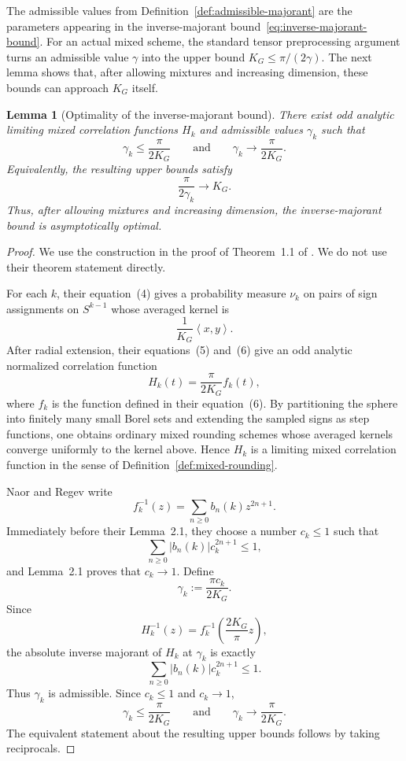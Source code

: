 \documentclass[11pt]{article}
\newtheorem{lemma}[theorem]{Lemma}
\numberwithin{equation}{section}
\newcommand{\ip}[2]{\left\langle #1,#2\right\rangle}
\begin{document}
The admissible values from Definition~\ref{def:admissible-majorant} are the parameters appearing in the inverse-majorant bound~\eqref{eq:inverse-majorant-bound}. For an actual mixed scheme, the standard tensor preprocessing argument turns an admissible value $\gamma$ into the upper bound $K_G\le\pi/(2\gamma)$. The next lemma shows that, after allowing mixtures and increasing dimension, these bounds can approach $K_G$ itself.

\begin{lemma}[Optimality of the inverse-majorant bound]\label{lem:inverse-majorant-optimal}
There exist odd analytic limiting mixed correlation functions $H_k$ and admissible values $\gamma_k$ such that
\[
        \gamma_k\le\frac{\pi}{2K_G}
        \qquad\text{and}\qquad
        \gamma_k\longrightarrow\frac{\pi}{2K_G}.
\]
Equivalently, the resulting upper bounds satisfy
\[
        \frac{\pi}{2\gamma_k}\longrightarrow K_G.
\]
Thus, after allowing mixtures and increasing dimension, the inverse-majorant bound is asymptotically optimal.
\end{lemma}

\begin{proof}
We use the construction in the proof of Theorem~1.1 of \cite{naor2014krivine}. We do not use their theorem statement directly.

For each $k$, their equation~(4) gives a probability measure $\nu_k$ on pairs of sign assignments on $S^{k-1}$ whose averaged kernel is
\[
        \frac{1}{K_G}\ip{x}{y}.
\]
After radial extension, their equations~(5) and~(6) give an odd analytic normalized correlation function
\[
        H_k(t)=\frac{\pi}{2K_G}f_k(t),
\]
where $f_k$ is the function defined in their equation~(6). By partitioning the sphere into finitely many small Borel sets and extending the sampled signs as step functions, one obtains ordinary mixed rounding schemes whose averaged kernels converge uniformly to the kernel above. Hence $H_k$ is a limiting mixed correlation function in the sense of Definition~\ref{def:mixed-rounding}.

Naor and Regev write
\[
        f_k^{-1}(z)=\sum_{n\ge0}b_n(k)z^{2n+1}.
\]
Immediately before their Lemma~2.1, they choose a number $c_k\le1$ such that
\[
        \sum_{n\ge0}|b_n(k)|c_k^{2n+1}\le1,
\]
and Lemma~2.1 proves that $c_k\to1$. Define
\[
        \gamma_k:=\frac{\pi c_k}{2K_G}.
\]
Since
\[
        H_k^{-1}(z)=f_k^{-1}\left(\frac{2K_G}{\pi}z\right),
\]
the absolute inverse majorant of $H_k$ at $\gamma_k$ is exactly
\[
        \sum_{n\ge0}|b_n(k)|c_k^{2n+1}\le1.
\]
Thus $\gamma_k$ is admissible. Since $c_k\le1$ and $c_k\to1$,
\[
        \gamma_k\le\frac{\pi}{2K_G}
        \qquad\text{and}\qquad
        \gamma_k\longrightarrow\frac{\pi}{2K_G}.
\]
The equivalent statement about the resulting upper bounds follows by taking reciprocals.
\end{proof}
\end{document}
